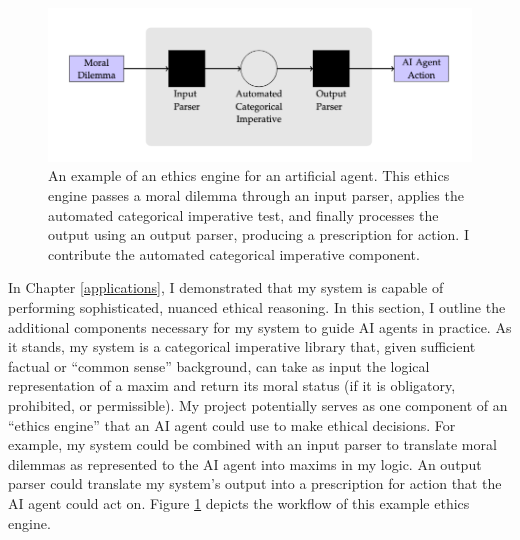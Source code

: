 %
\begin{isabellebody}%
%
%
\isadelimtheory
%
\endisadelimtheory
%
\isatagtheory
%
\endisatagtheory
{\isafoldtheory}%
%
\isadelimtheory
%
\endisadelimtheory
%
\isadelimdocument
%
\endisadelimdocument
%
\isatagdocument
%
\isamarkuptrue%
%
\isamarkuptrue%
%
\endisatagdocument
{\isafolddocument}%
%
\isadelimdocument
%
\endisadelimdocument
%
\begin{center}
\begin{figure}
\includegraphics[scale=0.43]{AI_engine.png}
\caption{An example of an ethics engine for an artificial agent. This ethics engine passes a moral dilemma 
through an input parser, applies the automated categorical imperative test, and finally processes the 
output using an output parser, producing a prescription for action. I contribute the automated categorical 
imperative component.} \label{fig:AIengine}
\end{figure}
\end{center}
%
\begin{isamarkuptext}%
In Chapter \ref{applications}, I demonstrated that my system is capable of performing sophisticated,
nuanced ethical reasoning. In this section, I outline the additional components necessary for my system
to guide AI agents in practice. As it stands, my system is a categorical imperative library that, given
sufficient factual or ``common sense'' background, can take 
as input the logical representation of a maxim and return its moral status (if it is obligatory, 
prohibited, or permissible). My project potentially 
serves as one component of an ``ethics engine'' that an AI agent could use to make ethical decisions.
For example, my system could be combined with an input parser to translate moral dilemmas as represented 
to the AI agent into maxims in my logic. An output parser could translate my system's output
into a prescription for action that the AI agent could act on. Figure \ref{fig:AIengine} depicts the 
workflow of this example ethics engine.


\end{isamarkuptext}
\end{isabellebody}
